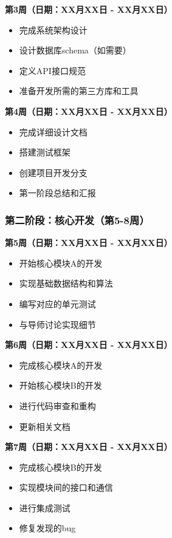 \documentclass[a4paper,12pt]{article}
\begin{document}
\textbf{第3周（日期：XX月XX日 - XX月XX日）}
\begin{itemize}
    \item 完成系统架构设计
    \item 设计数据库schema（如需要）
    \item 定义API接口规范
    \item 准备开发所需的第三方库和工具
\end{itemize}

\textbf{第4周（日期：XX月XX日 - XX月XX日）}
\begin{itemize}
    \item 完成详细设计文档
    \item 搭建测试框架
    \item 创建项目开发分支
    \item 第一阶段总结和汇报
\end{itemize}

\subsubsection{第二阶段：核心开发（第5-8周）}

\textbf{第5周（日期：XX月XX日 - XX月XX日）}
\begin{itemize}
    \item 开始核心模块A的开发
    \item 实现基础数据结构和算法
    \item 编写对应的单元测试
    \item 与导师讨论实现细节
\end{itemize}

\textbf{第6周（日期：XX月XX日 - XX月XX日）}
\begin{itemize}
    \item 完成核心模块A的开发
    \item 开始核心模块B的开发
    \item 进行代码审查和重构
    \item 更新相关文档
\end{itemize}

\textbf{第7周（日期：XX月XX日 - XX月XX日）}
\begin{itemize}
    \item 完成核心模块B的开发
    \item 实现模块间的接口和通信
    \item 进行集成测试
    \item 修复发现的bug
\end{itemize}
\end{document}
